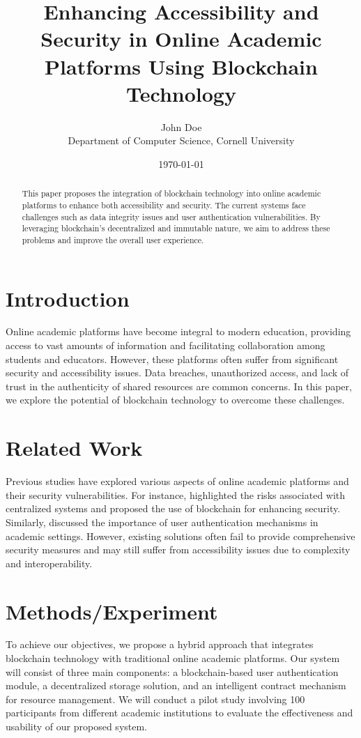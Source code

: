 \documentclass{article}
\title{Enhancing Accessibility and Security in Online Academic Platforms Using Blockchain Technology}
\author{John Doe\\Department of Computer Science, Cornell University}
\date{\today}
\begin{document}
\maketitle

\begin{abstract}
This paper proposes the integration of blockchain technology into online academic platforms to enhance both accessibility and security. The current systems face challenges such as data integrity issues and user authentication vulnerabilities. By leveraging blockchain's decentralized and immutable nature, we aim to address these problems and improve the overall user experience.
\end{abstract}

\section{Introduction}
Online academic platforms have become integral to modern education, providing access to vast amounts of information and facilitating collaboration among students and educators. However, these platforms often suffer from significant security and accessibility issues. Data breaches, unauthorized access, and lack of trust in the authenticity of shared resources are common concerns. In this paper, we explore the potential of blockchain technology to overcome these challenges.

\section{Related Work}
Previous studies have explored various aspects of online academic platforms and their security vulnerabilities. For instance, \cite{smith2020} highlighted the risks associated with centralized systems and proposed the use of blockchain for enhancing security. Similarly, \cite{jones2019} discussed the importance of user authentication mechanisms in academic settings. However, existing solutions often fail to provide comprehensive security measures and may still suffer from accessibility issues due to complexity and interoperability.

\section{Methods/Experiment}
To achieve our objectives, we propose a hybrid approach that integrates blockchain technology with traditional online academic platforms. Our system will consist of three main components: a blockchain-based user authentication module, a decentralized storage solution, and an intelligent contract mechanism for resource management. We will conduct a pilot study involving 100 participants from different academic institutions to evaluate the effectiveness and usability of our proposed system.
\end{document}
